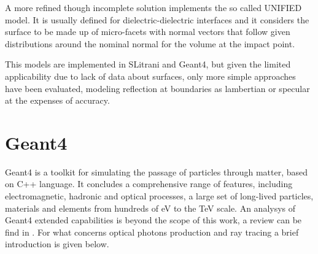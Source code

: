 A more refined though incomplete solution implements the so called UNIFIED model.  
It is usually defined for dielectric-dielectric interfaces and it considers the surface to be made up of micro-facets with normal vectors that follow given distributions around the nominal normal for the volume at the impact point.

This models are implemented in SLitrani and Geant4, but given the limited applicability due to lack of data about surfaces, only more simple approaches have been evaluated, modeling reflection at boundaries as lambertian or specular at the expenses of accuracy.

\section{Geant4}
Geant4 is a toolkit for simulating the passage of particles through matter, based on C++ language. It concludes a comprehensive range of features, including electromagnetic, hadronic and optical processes, a large set of long-lived particles, materials and elements from hundreds of eV to the TeV scale.
An analysys of Geant4 extended capabilities is beyond the scope of this work, a review can be find in \cite{Agostinelli2003}.
For what concerns optical photons production and ray tracing a brief introduction is given below.

